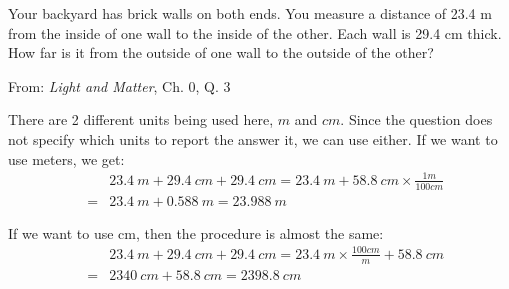 \documentclass[addpoints,12pt]{exam}
\begin{document}
\begin{questions}
\clearpage

\question[3]
Your backyard has brick walls on both ends. You measure a distance of 23.4 m from the inside of one wall to the inside of the other. Each wall is 29.4 cm thick. How far is it from the outside of one wall to the outside of the other?

From: \textit{Light and Matter}, Ch. 0, Q. 3
\begin{TheSolution}
\begin{center}\end{center}

There are 2 different units being used here, $m$ and $cm$. Since the question does not specify which units to report the answer it, we can use either. If we want to use meters, we get:
\begin{eqnarray}
&~& 23.4~m + 29.4~cm + 29.4~cm = 23.4~m + 58.8~cm \times\frac{1 m}{100 cm} \nonumber\\
&=& 23.4~m + 0.588~m = 23.988~m
\end{eqnarray}

If we want to use cm, then the procedure is almost the same:
\begin{eqnarray}
&~& 23.4~m + 29.4~cm + 29.4~cm = 23.4~m \times\frac{100 cm}{m} + 58.8~cm \nonumber\\
&=& 2340~cm + 58.8~cm = 2398.8~cm
\end{eqnarray}
\end{TheSolution}



\end{questions}
\end{document}
